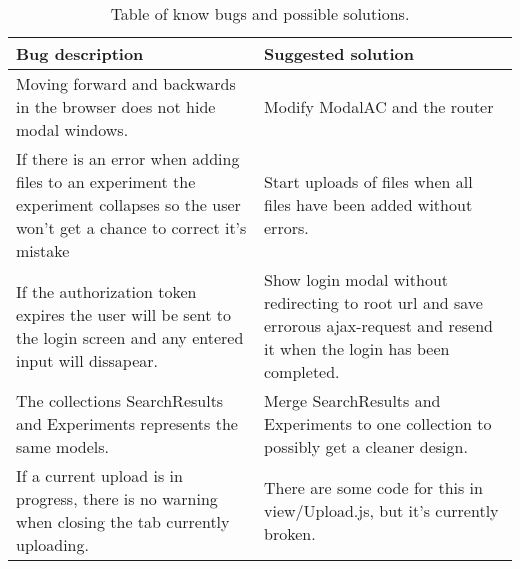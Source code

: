 \begin{table}[H]
\centering
\begin{tabular}{|p{5.5cm} | p{5.5cm}|}
	\hline
	Bug description & Suggested solution \\ \hline
	Moving forward and backwards in the browser does not hide modal windows. & Modify ModalAC and the router \\ \hline
	If there is an error when adding files to an experiment the experiment collapses so the user won't get a chance to correct it's mistake & Start uploads of files when all files have been added without errors. \\ \hline
	If the authorization token expires the user will be sent to the login screen and any entered input will dissapear. & Show login modal without redirecting to root url and save errorous ajax-request and resend it when the login has been completed. \\ \hline
	The collections SearchResults and Experiments represents the same models. & Merge SearchResults and Experiments to one collection to possibly get a cleaner design. \\ \hline
	If a current upload is in progress, there is no warning when closing the tab currently uploading. & There are some code for this in view/Upload.js, but it's currently broken. \\ \hline
\end{tabular}

\caption{\label{web_limitations} Table of know bugs and possible solutions.}
\end{table}
